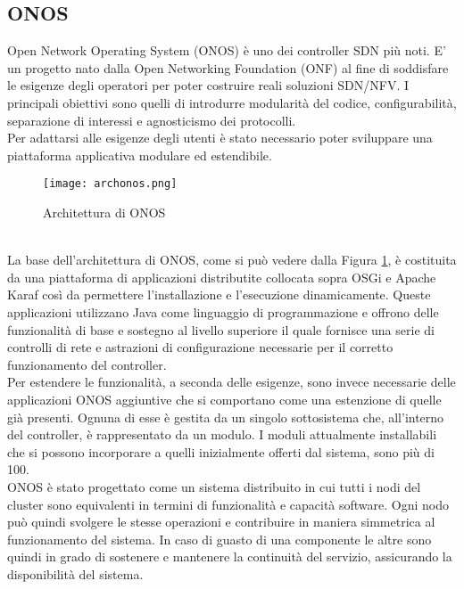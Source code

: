 \subsection{ONOS}
Open Network Operating System (ONOS) \cite{ONOS} è uno dei controller SDN più noti. 
E' un progetto nato dalla Open Networking Foundation (ONF) \cite{ONF} al fine di soddisfare le esigenze degli operatori per poter costruire reali soluzioni SDN/NFV.
I principali obiettivi sono quelli di introdurre modularità del codice, configurabilità, separazione di interessi e agnosticismo dei protocolli.
\\Per adattarsi alle esigenze degli utenti è stato necessario poter sviluppare una piattaforma applicativa modulare ed estendibile.
\begin{figure}[h]
    \centering
   \texttt{[image: archonos.png]}
    \caption{Architettura di ONOS \cite{archonos}}
    \label{fig:img3}
\end{figure}
\\La base dell'architettura di ONOS, come si può vedere dalla Figura \ref{fig:img3}, è costituita da una piattaforma di applicazioni distributite
collocata sopra OSGi \cite{osgi} e Apache Karaf \cite{Apache} così da permettere l'installazione e l'esecuzione dinamicamente. 
Queste applicazioni utilizzano Java come linguaggio di programmazione e offrono delle funzionalità di base e sostegno al livello superiore il quale fornisce una serie di controlli di rete e astrazioni di configurazione necessarie per il corretto funzionamento del controller.
\\Per estendere le funzionalità, a seconda delle esigenze, sono invece necessarie delle applicazioni ONOS aggiuntive che si comportano come una estenzione di quelle già presenti. 
Ognuna di esse è gestita da un singolo sottosistema che, all'interno del controller, è rappresentato da un modulo.
I moduli attualmente installabili che si possono incorporare a quelli inizialmente offerti dal sistema, sono più di 100.
\\ONOS è stato progettato come un sistema distribuito in cui tutti i nodi del cluster sono equivalenti in termini di funzionalità e capacità software.
Ogni nodo può quindi svolgere le stesse operazioni e contribuire in maniera simmetrica al funzionamento del sistema.
In caso di guasto di una componente le altre sono quindi in grado di sostenere e mantenere la continuità del servizio, assicurando la disponibilità del sistema. 
